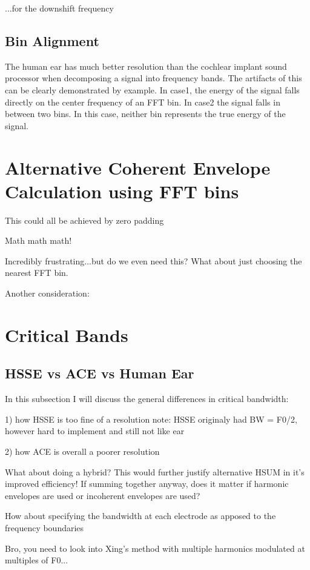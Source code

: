 \documentclass [11pt, proquest] {uwthesis}[2015/03/03]
\begin{document}
...for the downshift frequency

\subsection{Bin Alignment}

The human ear has much better resolution than the cochlear implant sound processor when decomposing a signal into frequency bands.  The artifacts of this can be clearly demonstrated by example.  In case1, the energy of the signal falls directly on the center frequency of an FFT bin.  In case2 the signal falls in between two bins.  In this case, neither bin represents the true energy of the signal.

\section{Alternative Coherent Envelope Calculation using FFT bins}

This could all be achieved by zero padding

Math math math!

Incredibly frustrating...but do we even need this?  What about just choosing the nearest FFT bin.

Another consideration: 

\section{Critical Bands}

\subsection{HSSE vs ACE vs Human Ear}

In this subsection I will discuss the general differences in critical bandwidth:

1) how HSSE is too fine of a resolution
note: HSSE originaly had BW = F0/2, however hard to implement and still not like ear

2) how ACE is overall a poorer resolution

What about doing a hybrid?  This would further justify alternative HSUM in it's improved efficiency!  If summing together anyway, does it matter if harmonic envelopes are used or incoherent envelopes are used?

How about specifying the bandwidth at each electrode as apposed to the frequency boundaries

Bro, you need to look into Xing's method with multiple harmonics modulated at multiples of F0...
\end{document}
